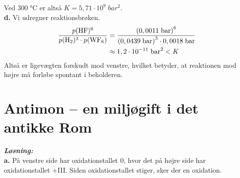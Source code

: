 \documentclass{report}
\newcommand{\sol}{\setlength{\parindent}{0cm}\textbf{\textit{Løsning:}}\setlength{\parindent}{1cm}}
\begin{document}
Ved $300 \;\unit{\celsius} $ er altså $K=5,71 \cdot 10^9 \;\unit{bar^2} $. \\[1ex]
\textbf{d.}
Vi udregner reaktionsbrøken.
\begin{equation*}
\begin{split}
  \frac{p(\ce{HF} )^6}{p(\ce{ H2})^3 \cdot p(\ce{WF6} )}&=\frac{\left(0,0011 \;\unit{bar} \right)^6}{\left(0,0439 \;\unit{bar} \right)^3 \cdot 0,0018 \;\unit{bar} }\\
  &\approx 1,2 \cdot 10 ^{-11} \;\unit{bar^2} <K 
\end{split}
\end{equation*}
Altså er ligevægten forskudt mod venstre, hvilket betyder, at reaktionen mod højre må forløbe spontant i beholderen.

\section*{Antimon – en miljøgift i det antikke Rom}
\sol \\
\textbf{a.}
På venstre side har  oxidationstallet $0$, hvor det på højre side har oxidationstallet +III.
Siden oxidationstallet stiger, sker der en oxidation.
\end{document}
